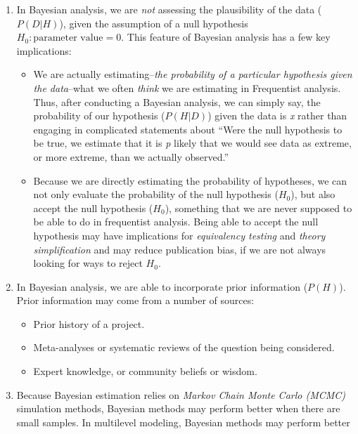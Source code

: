 \documentclass[
]{article}
\providecommand{\tightlist}{%
  \setlength{\itemsep}{0pt}\setlength{\parskip}{0pt}}
\begin{document}
\begin{enumerate}
\def\labelenumi{\arabic{enumi}.}
\item
  In Bayesian analysis, we are \emph{not} assessing the plausibility of
  the data (\(P(D|H)\)), given the assumption of a null hypothesis
  \(H_0: \text{parameter value} = 0\). This feature of Bayesian analysis
  has a few key implications:

  \begin{itemize}
  \tightlist
  \item
    We are actually estimating--\emph{the probability of a particular
    hypothesis given the data}--what we often \emph{think} we are
    estimating in Frequentist analysis. Thus, after conducting a
    Bayesian analysis, we can simply say, the probability of our
    hypothesis (\(P(H|D)\)) given the data is \emph{x} rather than
    engaging in complicated statements about ``Were the null hypothesis
    to be true, we estimate that it is \emph{p} likely that we would see
    data as extreme, or more extreme, than we actually observed.''
  \item
    Because we are directly estimating the probability of hypotheses, we
    can not only evaluate the probability of the null hypothesis
    (\(H_0\)), but also accept the null hypothesis (\(H_0\)), something
    that we are never supposed to be able to do in frequentist analysis.
    Being able to accept the null hypothesis may have implications for
    \emph{equivalency testing} and \emph{theory simplification} and may
    reduce publication bias, if we are not always looking for ways to
    reject \(H_0\).
  \end{itemize}
\item
  In Bayesian analysis, we are able to incorporate prior information
  (\(P(H)\)). Prior information may come from a number of sources:

  \begin{itemize}
  \tightlist
  \item
    Prior history of a project.
  \item
    Meta-analyses or systematic reviews of the question being
    considered.
  \item
    Expert knowledge, or community beliefs or wisdom.
  \end{itemize}
\item
  Because Bayesian estimation relies on \emph{Markov Chain Monte Carlo
  (MCMC)} simulation methods, Bayesian methods may perform better when
  there are small samples. In multilevel modeling, Bayesian methods may
  perform better
\end{enumerate}
\end{document}
